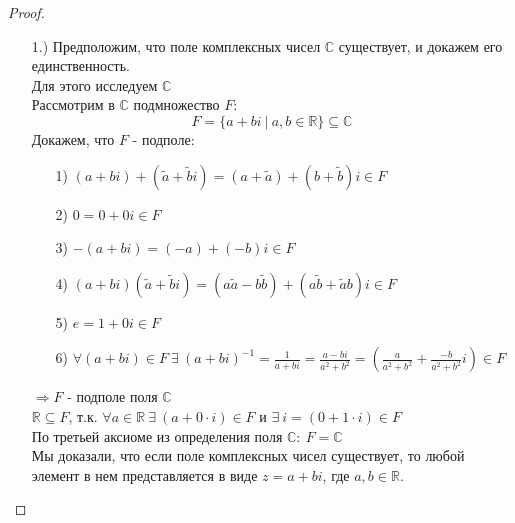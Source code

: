 \documentclass[a4paper, 12pt]{article}
\newcommand{\R}{\mathbb R}
\newcommand\tab[1][.5cm]{\hspace*{#1}}
\theoremstyle{definition}
\begin{document}
  \begin{proof}\tab
    \begin{itemize}
      \item[1.)]Предположим, что поле комплексных чисел $\mathbb{C}$ существует, и докажем его единственность. \\
      Для этого исследуем $\mathbb{C}$ \\
      Рассмотрим в $\mathbb{C}$ подмножество $F$: 
      $$F = \{a+bi \ | \ a,b \in \R\} \subseteq \mathbb{C}$$
      Докажем, что $F$ - подполе:
      \begin{itemize}
        \item[1)] $(a+bi) + (\widetilde{a}+\widetilde{b}i) = (a + \widetilde{a})+(b+\widetilde{b})i \in F$
        \item[2)] $0 = 0 + 0i \in F$
        \item[3)] $-(a+bi) = (-a) + (-b)i\in F$
        \item[4)] $(a+bi)(\widetilde{a}+\widetilde{b}i) = (a \widetilde{a}-b \widetilde{b}) + (a \widetilde{b}+ \widetilde{a} b)i \in F$
        \item[5)] $e = 1 + 0i \in F$
        \item[6)] $\forall (a+bi) \in F \ \exists \ (a+bi)^{-1} = \frac{1}{a+bi} = \frac{a-bi}{a^2+b^2} = (\frac{a}{a^2+b^2} + \frac{-b}{a^2+b^2}i) \in F$ 
      \end{itemize}
      $\Longrightarrow F$ - подполе поля $\mathbb{C}$ \\
      $\R \subseteq F$, т.к. $\forall a \in \R \ \exists \ (a + 0 \cdot i) \in F$ и $\exists \ i = (0 + 1 \cdot i) \in F$\\
      По третьей аксиоме из определения поля $\mathbb{C}: \ F=\mathbb{C}$\\
      Мы доказали, что если поле комплексных чисел существует, то любой элемент в нем представляется в виде $z = a + bi$, где $a, b \in \R$.\\

\end{itemize}
\end{proof}
\end{document}
